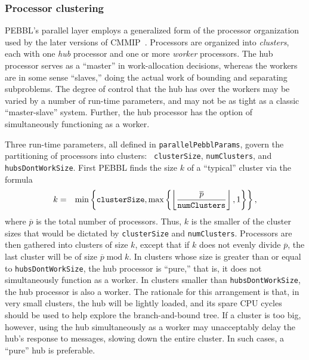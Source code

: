 \subsubsection{Processor clustering}
\label{sec:clustering}
PEBBL's parallel layer employs a generalized form of the processor
organization used by the later versions of CMMIP~\cite{Eck94,Eck97}.
Processors are organized into \emph{clusters}, each with one
\emph{hub} processor and one or more \emph{worker} processors.  The
hub processor serves as a ``master'' in work-allocation decisions,
whereas the workers are in some sense ``slaves,'' doing the actual
work of bounding and separating subproblems. The degree of control
that the hub has over the workers may be varied by a number of
run-time parameters, and may not be as tight as a classic
``master-slave'' system.  Further, the hub processor has the option of
simultaneously functioning as a worker.

Three run-time parameters, all defined in \texttt{parallelPebblParams},
govern the partitioning of processors into clusters: {\tt
clusterSize}, \texttt{numClusters}, and \texttt{hubsDontWorkSize}.  First
PEBBL finds the size $k$ of a ``typical'' cluster via the formula
\begin{eqnarray*}
k &= &
\min \left\{ 
\mbox{\tt clusterSize},
\max \left\{
\left\lfloor \frac{\overline{p}}{\mbox{\tt numClusters}}
\right\rfloor,
1
\right\}
\right\} ,
\end{eqnarray*}
where $\overline{p}$ is the total number of processors.  Thus, $k$ is
the smaller of the cluster sizes that would be dictated by
\texttt{clusterSize} and \texttt{numClusters}.  Processors are then
gathered into clusters of size $k$, except that if $k$ does not evenly
divide $\overline{p}$, the last cluster will be of size
$\overline{p}\; \mbox{mod}\;k$.
In clusters whose size is greater than or equal to
\texttt{hubsDontWorkSize}, the hub processor is ``pure,'' that is, it
does not simultaneously function as a worker.  In clusters smaller
than \texttt{hubsDontWorkSize}, the hub processor is also a worker.
The rationale for this arrangement is that, in very small clusters,
the hub will be lightly loaded, and its spare CPU cycles should be
used to help explore the branch-and-bound tree.  If a cluster is too
big, however, using the hub simultaneously as a worker may
unacceptably delay the hub's response to messages, slowing down the
entire cluster.  In such cases, a ``pure'' hub is preferable.


